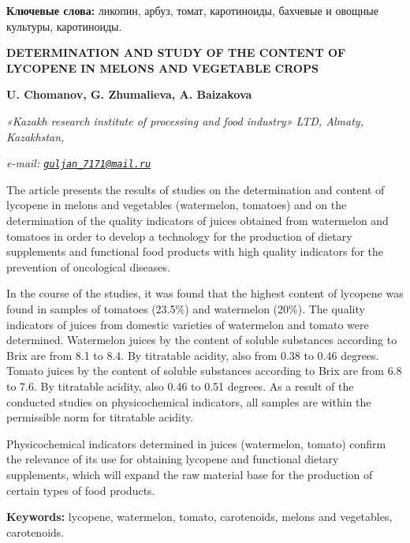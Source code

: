 {\bfseries Ключевые слова:} ликопин, арбуз, томат, каротиноиды, бахчевые и
овощные культуры, каротиноиды.

\begin{articleheader}
{\bfseries DETERMINATION AND STUDY OF THE CONTENT OF LYCOPENE IN MELONS AND VEGETABLE CROPS}

{\bfseries
U. Chomanov,
G. Zhumalieva\textsuperscript{\envelope },
A. Baizakova}
\end{articleheader}

\begin{affiliation}
\emph{«Kazakh research institute of processing and food industry» LTD, Almaty, Kazakhstan,}

\emph{e-mail: \href{mailto:guljan_7171@mail.ru}{\nolinkurl{guljan\_7171@mail.ru}}}
\end{affiliation}

The article presents the results of studies on the determination and
content of lycopene in melons and vegetables (watermelon, tomatoes) and
on the determination of the quality indicators of juices obtained from
watermelon and tomatoes in order to develop a technology for the
production of dietary supplements and functional food products with high
quality indicators for the prevention of oncological diseases.

In the course of the studies, it was found that the highest content of
lycopene was found in samples of tomatoes (23.5\%) and watermelon
(20\%). The quality indicators of juices from domestic varieties of
watermelon and tomato were determined. Watermelon juices by the content
of soluble substances according to Brix are from 8.1 to 8.4. By
titratable acidity, also from 0.38 to 0.46 degrees. Tomato juices by the
content of soluble substances according to Brix are from 6.8 to 7.6. By
titratable acidity, also 0.46 to 0.51 degrees. As a result of the
conducted studies on physicochemical indicators, all samples are within
the permissible norm for titratable acidity.

Physicochemical indicators determined in juices (watermelon, tomato)
confirm the relevance of its use for obtaining lycopene and functional
dietary supplements, which will expand the raw material base for the
production of certain types of food products.

{\bfseries Keywords:} lycopene, watermelon, tomato, carotenoids, melons and
vegetables, carotenoids.

